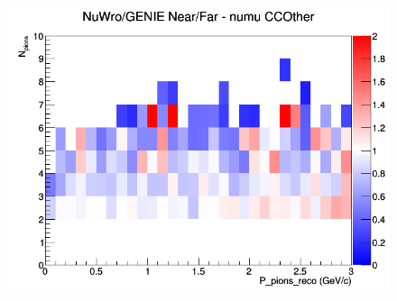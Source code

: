 \documentclass[12pt]{article}
\begin{document}
\begin{figure}[h]
\endminipage
{}
\includegraphics[width=\linewidth]{eff_N_P/GAr/pions/ratios/CCOther_NuWro_GENIE_numu_NF_N_P.png}
\endminipage
\newline
\end{figure}
\clearpage
\end{document}
